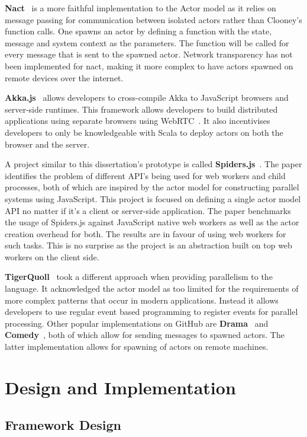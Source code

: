 \documentclass[12pt, a4paper]{report}
\theoremstyle{definition}
\theoremstyle{definition}%
\theoremstyle{definition}%
\theoremstyle{definition}%
\theoremstyle{definition}%
\theoremstyle{definition}%
\begin{document}
\textbf{Nact}~\cite{nact} is a more faithful implementation to the Actor model as it relies on message passing for communication between isolated actors rather than Clooney's function calls. One spawns an actor by defining a function with the state, message and system context as the parameters. The function will be called for every message that is sent to the spawned actor. Network transparency has not been implemented for nact, making it more complex to have actors spawned on remote devices over the internet.

\textbf{Akka.js}~\cite{stivan2015akka} allows developers to cross-compile Akka to JavaScript browsers and server-side runtimes. This framework allows developers to build distributed applications using separate browsers using WebRTC~. It also incentivises developers to only be knowledgeable with Scala to deploy actors on both the browser and the server.

A project similar to this dissertation's prototype is called \textbf{Spiders.js}~\cite{spidersjs}. The paper identifies the problem of different API's being used for web workers and child processes, both of which are inspired by the actor model for constructing parallel systems using JavaScript. This project is focused on defining a single actor model API no matter if it's a client or server-side application. The paper benchmarks the usage of Spiders.js against JavaScript native web workers as well as the actor creation overhead for both. The results are in favour of using web workers for such tasks. This is no surprise as the project is an abstraction built on top web workers on the client side.

\textbf{TigerQuoll}~\cite{tigerquoll} took a different approach when providing parallelism to the language. It acknowledged the actor model as too limited for the requirements of more complex patterns that occur in modern applications. Instead it allows developers to use regular event based programming to register events for parallel processing. Other popular implementations on GitHub are \textbf{Drama}~\cite{drama} and \textbf{Comedy}~\cite{comedy}, both of which allow for sending messages to spawned actors. The latter implementation allows for spawning of actors on remote machines.

\chapter{Design and Implementation}
\section{Framework Design}
\end{document}
